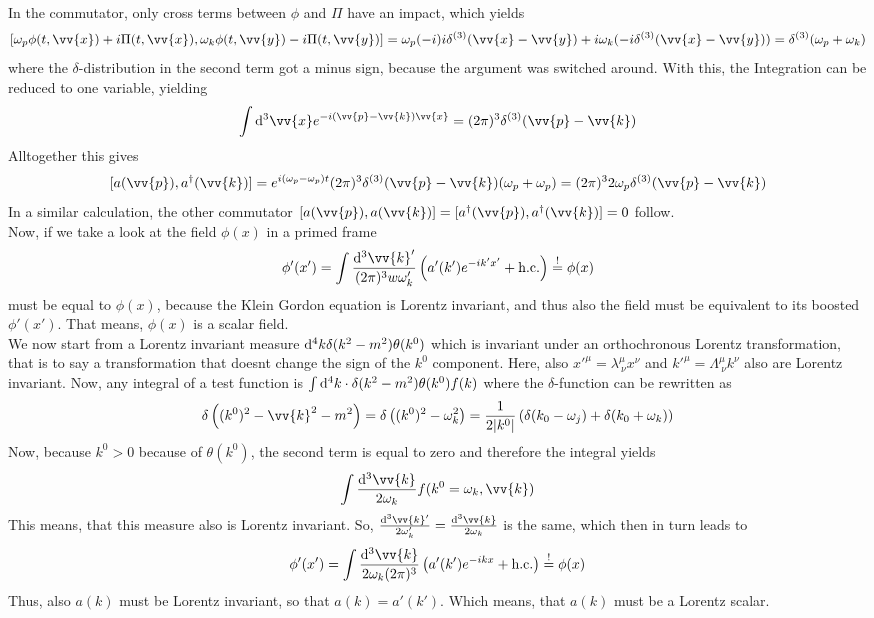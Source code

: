 \documentclass{include/thesisclass}
\newcommand{\cc}{\cdot}
\newcommand{\vx}{\vv{x}}
\newcommand{\vy}{\vv{y}}
\newcommand{\vp}{\vv{p}}
\newcommand{\dd}{{\rm d}}
\newcommand{\soll}{\overset{!}{=}}
\newcommand{\hc}{\text{h.c.}}
\begin{document}
In the commutator, only cross terms between $\phi$ and $\Pi$ have an impact, which yields
\[ [ \omega_p \phi(t, \vx) + i \Pi(t, \vx), \omega_k\phi(t, \vy) - i \Pi(t, \vy)] = \omega_p(-i)i\delta^{(3)}(\vx - \vy) + i \omega_k ( -i \delta^{(3)}(\vx - \vy)) = \delta^{(3)} ( \omega_p + \omega_k)\]
where the $\delta$-distribution in the second term got a minus sign, because the argument was switched around. With this, the Integration can be reduced to one variable, yielding 
\[ \int \dd^3 \vx e^{-i ( \vp - \vv{k} ) \vx} = (2\pi)^3 \delta^{(3)}(\vp - \vv{k})\]
Alltogether this gives
\[ [a(\vp) , a^\dagger( \vv{k})] = e^{i(\omega_p - \omega_p)t} (2\pi)^3 \delta^{(3)}(\vp - \vv{k}) ( \omega_p + \omega_p) = (2\pi)^3 2 \omega _p \delta^{(3)}(\vp - \vv{k})\]
In a similar calculation, the other commutator $[a(\vp), a(\vv{k})] = [a^\dagger(\vp), a^\dagger(\vv{k})] = 0$ follow.\\
Now, if we take a look at the field $\phi(x)$ in a primed frame
\[ \phi'(x') = \int \frac{\dd^3 \vv{k}'}{(2\pi)^3 w \omega_k'} \left( a'(k') e^{-i k'x'} + \hc\right) \soll \phi(x)\]
must be equal to $\phi(x)$, because the Klein Gordon equation is Lorentz invariant, and thus also the field must be equivalent to its boosted $\phi'(x')$. That means, $\phi(x)$ is a scalar field.\\
We now start from a Lorentz invariant measure $\dd ^4 k \delta( k^2 - m^2) \theta(k^0)$ which is invariant under an orthochronous Lorentz transformation, that is to say a transformation that doesnt change the sign of the $k^0$ component. Here, also $x'^\mu = \lambda^\mu_{~\nu} x^\nu$ and $k'^\mu = \Lambda^\mu_{~\nu}k^\nu$ also are Lorentz invariant. Now, any integral of a test function is $\int \dd^4 k\cc \delta(k^2 - m^2) \theta(k^0) f(k)$ where the $\delta$-function can be rewritten as
\[ \delta\left( (k^0)^2 - \vv{k}^2 - m^2\right) = \delta\left( (k^0)^2 - \omega_k^2\right) = \frac{1}{2 |k^0|} \left( \delta( k_0 - \omega_j) + \delta( k_0 + \omega_k)\right) \]
Now, because $k^0 > 0$ because of $\theta(k^0)$, the second term is equal to zero and therefore the integral yields
\[ \int \frac{\dd^3 \vv{k}}{2 \omega_k} f( k^0 = \omega_k, \vv{k})\]
This means, that this measure also is Lorentz invariant. So, $\frac{\dd^3 \vv{k}'}{2\omega_k'} = \frac{\dd^3 \vv{k}}{2 \omega_k}$ is the same, which then in turn leads to
\[ \phi'(x') = \int \frac{ \dd^3 \vv{k}}{2 \omega_k (2\pi)^3} \left( a'(k') e^{-i k x} + \hc\right) \soll \phi(x)\]
Thus, also $a(k)$ must be Lorentz invariant, so that $a(k) = a'(k')$. Which means, that $a(k)$ must be a Lorentz scalar.\\
\end{document}
